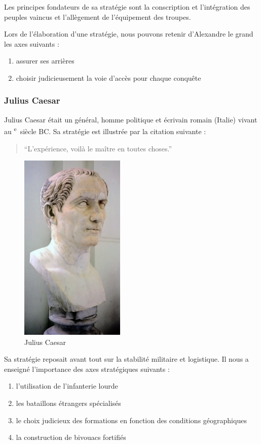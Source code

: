 \documentclass{article}
\newcommand{\cRM}[1]{\MakeUppercase{\romannumeral #1}}  %
\newcommand{\siecle}[1]{\cRM{#1}\textsuperscript{e}~siècle}
\begin{document}
Les principes fondateurs de sa stratégie sont la conscription et l'intégration des peuples vaincus et l'allègement de l'équipement des troupes.

Lors de l'élaboration d'une stratégie, nous pouvons retenir d'Alexandre le grand les axes suivants \cite{alexandre_balkans} :
\begin{enumerate}
\item assurer ses arrières
\item choisir judicieusement la voie d'accès pour chaque conquête
\end{enumerate}


\subsubsection{Julius Caesar}
Julius Caesar était un général, homme politique et écrivain romain (Italie) vivant au \siecle{1} BC. Sa stratégie est illustrée par la citation suivante : \begin{quote}“L’expérience, voilà le maître en toutes choses.”\end{quote}
\begin{figure}[H]
	\begin{centering}
	\includegraphics[width=5cm]{../ressources/cesare}
	\caption{Julius Caesar \cite{caesar_wiki}}
	\end{centering}
\end{figure}

Sa stratégie reposait avant tout sur la stabilité militaire et logistique. Il nous a enseigné l'importance des axes stratégiques suivants \cite{caesar_lacks} :
\begin{enumerate}
\item l'utilisation de l'infanterie lourde
\item les bataillons étrangers spécialisés
\item le choix judicieux des formations en fonction des conditions géographiques
\item la construction de bivouacs fortifiés
\end{enumerate}
\end{document}
